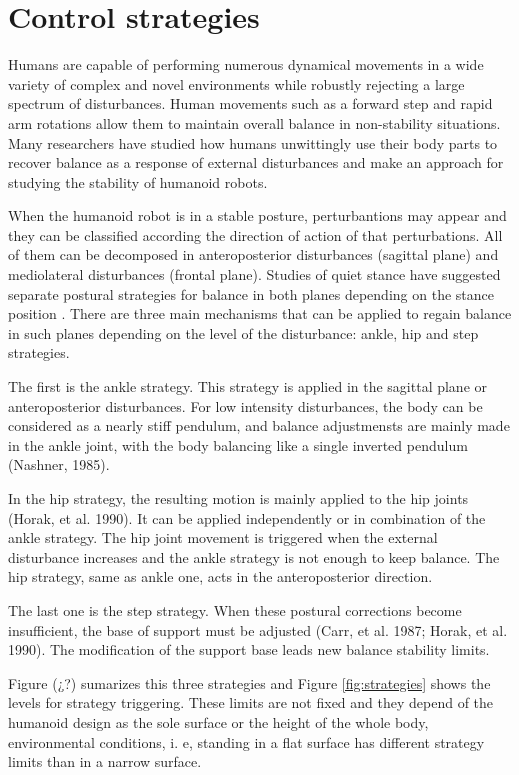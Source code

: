 \section{Control strategies}
Humans are capable of performing numerous dynamical movements in a wide variety of complex and novel environments while robustly rejecting a large spectrum of disturbances. Human movements such as a forward step and rapid arm rotations allow them to maintain overall balance in non-stability situations. Many researchers have studied how humans unwittingly use their body parts to recover balance as a response of external disturbances and make an approach for studying the stability of humanoid robots.

When the humanoid robot is in a stable posture, perturbantions may appear and they can be classified according the direction of action of that perturbations. All of them can be decomposed in anteroposterior disturbances (sagittal plane) and mediolateral disturbances (frontal plane). Studies of quiet stance have suggested separate postural strategies for balance in both planes depending on the stance position \cite{Winter1996}. There are three main mechanisms that can be applied to regain balance in such planes depending on the level of the disturbance: ankle, hip and step strategies.

The first is the ankle strategy. This strategy is applied in the sagittal plane or anteroposterior disturbances. For low intensity disturbances, the body can be considered as a nearly stiff pendulum, and balance adjustmensts are mainly made in the ankle joint, with the body balancing like a single inverted pendulum (Nashner, 1985). 

In the hip strategy, the resulting motion is mainly applied to the hip joints (Horak, et al. 1990). It can be applied independently or in combination of the ankle strategy. The hip joint movement is triggered when the external disturbance increases and the ankle strategy is not enough to keep balance. The hip strategy, same as ankle one, acts in the anteroposterior direction.

The last one is the step strategy. When these postural corrections become insufficient, the base of support must be adjusted (Carr, et al. 1987; Horak, et al. 1990). The modification of the support base leads new balance stability limits.

Figure (¿?) sumarizes this three strategies and Figure \ref{fig:strategies} shows the levels for strategy triggering. These limits are not fixed and they depend of the humanoid design as the sole surface or the height of the whole body, environmental conditions, i. e, standing in a flat surface has different strategy limits than in a narrow surface.

